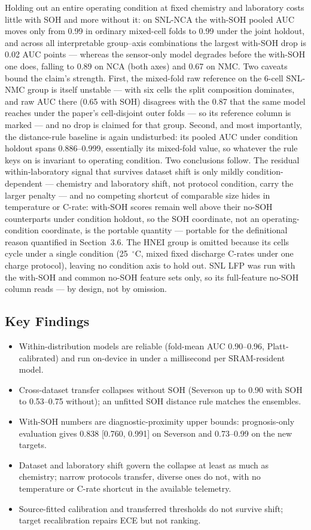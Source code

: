 \documentclass[preprint,12pt]{elsarticle}
\begin{document}
Holding out an entire operating condition at fixed chemistry and laboratory costs little with SOH and more without it: on SNL-NCA the with-SOH pooled AUC moves only from 0.99 in ordinary mixed-cell folds to 0.99 under the joint holdout, and across all interpretable group--axis combinations the largest with-SOH drop is 0.02 AUC points --- whereas the sensor-only model degrades before the with-SOH one does, falling to 0.89 on NCA (both axes) and 0.67 on NMC. Two caveats bound the claim's strength. First, the mixed-fold raw reference on the 6-cell SNL-NMC group is itself unstable --- with six cells the split composition dominates, and raw AUC there (0.65 with SOH) disagrees with the 0.87 that the same model reaches under the paper's cell-disjoint outer folds --- so its reference column is marked --- and no drop is claimed for that group. Second, and most importantly, the distance-rule baseline is again undisturbed: its pooled AUC under condition holdout spans 0.886--0.999, essentially its mixed-fold value, so whatever the rule keys on is invariant to operating condition. Two conclusions follow. The residual within-laboratory signal that survives dataset shift is only mildly condition-dependent --- chemistry and laboratory shift, not protocol condition, carry the larger penalty --- and no competing shortcut of comparable size hides in temperature or C-rate: with-SOH scores remain well above their no-SOH counterparts under condition holdout, so the SOH coordinate, not an operating-condition coordinate, is the portable quantity --- portable for the definitional reason quantified in Section~3.6. The HNEI group is omitted because its cells cycle under a single condition (25~$^\circ$C, mixed fixed discharge C-rates under one charge protocol), leaving no condition axis to hold out. SNL LFP was run with the with-SOH and common no-SOH feature sets only, so its full-feature no-SOH column reads --- by design, not by omission.

\subsection{Key Findings}
\begin{itemize}
\item Within-distribution models are reliable (fold-mean AUC 0.90--0.96, Platt-calibrated) and run on-device in under a millisecond per SRAM-resident model.
\item Cross-dataset transfer collapses without SOH (Severson up to 0.90 with SOH to 0.53--0.75 without); an unfitted SOH distance rule matches the ensembles.
\item With-SOH numbers are diagnostic-proximity upper bounds: prognosis-only evaluation gives 0.838 [0.760, 0.991] on Severson and 0.73--0.99 on the new targets.
\item Dataset and laboratory shift govern the collapse at least as much as chemistry; narrow protocols transfer, diverse ones do not, with no temperature or C-rate shortcut in the available telemetry.
\item Source-fitted calibration and transferred thresholds do not survive shift; target recalibration repairs ECE but not ranking.
\end{itemize}
\end{document}
